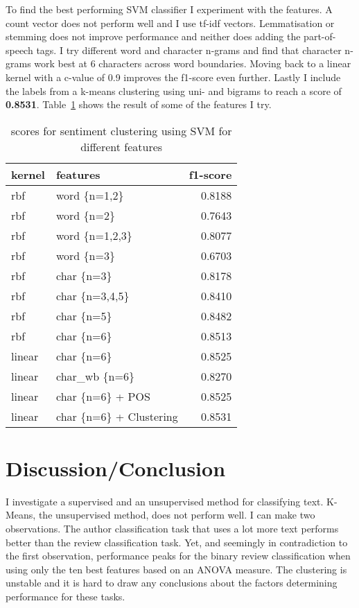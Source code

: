 \documentclass[11pt]{article}
\begin{document}
To find the best performing SVM classifier I experiment with the features. A count vector does not perform well and I use tf-idf vectors. Lemmatisation or stemming does not improve performance and neither does adding the part-of-speech tags. I try different word and character n-grams and find that character n-grams work best at 6 characters across word boundaries. Moving back to a linear kernel with a c-value of 0.9 improves the f1-score even further. Lastly I include the labels from a k-means clustering using uni- and bigrams to reach a score of \textbf{0.8531}. Table~\ref{tab:svm-feat} shows the result of some of the features I try.

\begin{table}[ht]\footnotesize
\centering
\caption{scores for sentiment clustering using SVM for different features}
\label{tab:svm-feat}
\begin{tabular}{ l l r }
kernel & features & f1-score \\
\hline
rbf    &  word \{n=1,2\}            & 0.8188 \\
rbf    &  word \{n=2\}              & 0.7643 \\
rbf    &  word \{n=1,2,3\}          & 0.8077 \\
rbf    &  word \{n=3\}              & 0.6703 \\
rbf    &  char \{n=3\}              & 0.8178 \\
rbf    &  char \{n=3,4,5\}          & 0.8410 \\
rbf    &  char \{n=5\}              & 0.8482 \\
rbf    &  char \{n=6\}              & 0.8513 \\
linear &  char \{n=6\}              & 0.8525 \\
linear &  char\_wb \{n=6\}           & 0.8270 \\
linear &  char \{n=6\} + POS        & 0.8525 \\
linear &  char \{n=6\} + Clustering & 0.8531 \\
\end{tabular}
\end{table}

\section{Discussion/Conclusion}

I investigate a supervised and an unsupervised method for classifying text. K-Means, the unsupervised method, does not perform well. I can make two observations. The author classification task that uses a lot more text performs better than the review classification task. Yet, and seemingly in contradiction to the first observation, performance peaks for the binary review classification when using only the ten best features based on an ANOVA measure. The clustering is unstable and it is hard to draw any conclusions about the factors determining performance for these tasks.
\end{document}

